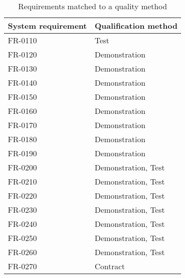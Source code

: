 \begin{table}[H]
\centering
\begin{tabular}{|l|l|}
\hline
 \textbf{System requirement} & \textbf{Qualification method} \\ \hline
 FR-0110 & Test \\  \hline
 FR-0120 & Demonstration \\  \hline
 FR-0130 & Demonstration \\  \hline
 FR-0140 & Demonstration \\  \hline
 FR-0150 & Demonstration \\  \hline
 FR-0160 & Demonstration \\  \hline
 FR-0170 & Demonstration  \\  \hline
 FR-0180 & Demonstration \\  \hline
 FR-0190 & Demonstration  \\  \hline
 FR-0200 & Demonstration, Test  \\  \hline
 FR-0210 & Demonstration, Test \\  \hline
 FR-0220 & Demonstration, Test \\  \hline
 FR-0230 & Demonstration, Test \\  \hline
 FR-0240 & Demonstration, Test \\  \hline
 FR-0250 & Demonstration, Test \\  \hline
 FR-0260 & Demonstration, Test \\  \hline               
 FR-0270 & Contract \\  \hline
\end{tabular}
\caption{Requirements matched to a quality method}
\end{table}